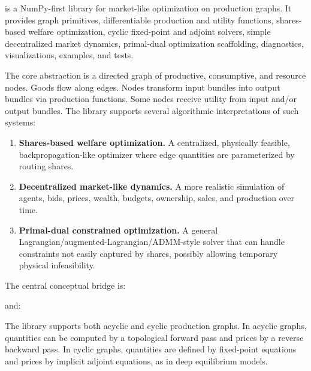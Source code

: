  is a NumPy-first library for market-like optimization on production
graphs. It provides graph primitives, differentiable production and utility functions,
shares-based welfare optimization, cyclic fixed-point and adjoint solvers, simple
decentralized market dynamics, primal-dual optimization scaffolding, diagnostics,
visualizations, examples, and tests. 

The core abstraction is a directed graph of productive, consumptive, and resource nodes.
Goods flow along edges. Nodes transform input bundles into output bundles via production
functions. Some nodes receive utility from input and/or output bundles. The library supports
several algorithmic interpretations of such systems:
\begin{enumerate}
  \item \textbf{Shares-based welfare optimization.} A centralized, physically feasible,
  backpropagation-like optimizer where edge quantities are parameterized by routing shares.
  \item \textbf{Decentralized market-like dynamics.} A more realistic simulation of agents,
  bids, prices, wealth, budgets, ownership, sales, and production over time.
  \item \textbf{Primal-dual constrained optimization.} A general
  Lagrangian/augmented-Lagrangian/ADMM-style solver that can handle constraints not easily
  captured by shares, possibly allowing temporary physical infeasibility.
\end{enumerate}

The central conceptual bridge is:
\begin{center}
\end{center}
and:
\begin{center}
\end{center}

The library supports both acyclic and cyclic production graphs. In acyclic graphs,
quantities can be computed by a topological forward pass and prices by a reverse backward
pass. In cyclic graphs, quantities are defined by fixed-point equations and prices by
implicit adjoint equations, as in deep equilibrium models.

